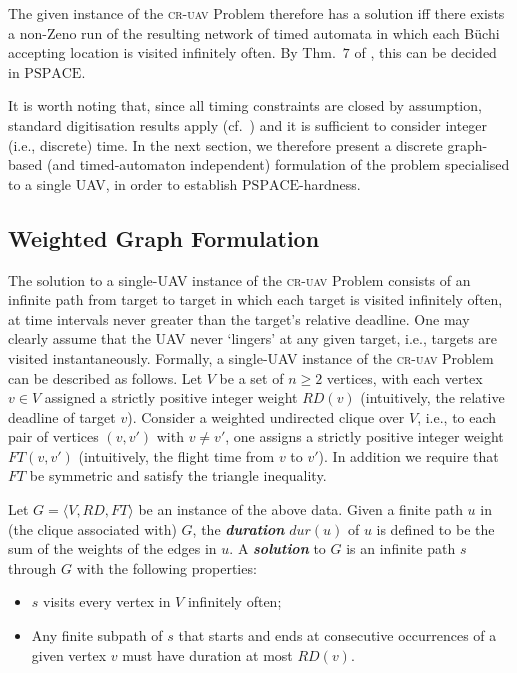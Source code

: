 \documentclass[envcountsame]{llncs}
\begin{document}
The given instance of the \textsc{cr-uav} Problem therefore has a
solution iff there exists a non-Zeno run of the resulting network of
timed automata in which each B\"uchi accepting location is visited
infinitely often. By Thm.~$7$ of \cite{Alur1998}, this can be decided in
$\mathrm{PSPACE}$.

It is worth noting that, since all timing constraints are closed by
assumption, standard digitisation results apply (cf.~\cite{Henzinger1992}) and
it is sufficient to consider integer (i.e., discrete) time. In the
next section, we therefore present a discrete graph-based (and
timed-automaton independent) formulation of the problem specialised to
a single UAV, in order to establish $\mathrm{PSPACE}$-hardness.

\subsection{Weighted Graph Formulation}

The solution to a single-UAV instance of the \textsc{cr-uav} Problem
consists of an infinite path from target to target in which each
target is visited infinitely often, at time intervals never greater
than the target's relative deadline. One may clearly assume that the
UAV never `lingers' at any given target, i.e., targets are visited
instantaneously.  Formally, a single-UAV instance of the \textsc{cr-uav} Problem can be
described as follows. Let $V$ be a set of $n \geq 2$ vertices, with
each vertex $v \in V$ assigned a strictly positive integer weight
$\mathit{RD}(v)$ (intuitively, the relative deadline of target
$v$). Consider a weighted undirected clique over $V$, i.e., to each
pair of vertices $(v,v')$ with $v \neq v'$, one assigns a strictly
positive integer weight $\mathit{FT}(v,v')$ (intuitively, the flight
time from $v$ to $v'$). In addition we require that $\mathit{FT}$ be
symmetric and satisfy the triangle inequality.








Let $G = \langle V,\mathit{RD}, \mathit{FT}\rangle$ be an instance of
the above data. Given a finite path $u$ in (the clique associated
with) $G$, the \emph{\textbf{duration}} $\mathit{dur}(u)$ of $u$ is
defined to be the sum of the weights of the edges in $u$. A
\emph{\textbf{solution}} to $G$ is an infinite path $s$ through $G$ with the
following properties:
\begin{itemize}
\item $s$ visits every vertex in $V$ infinitely often;
\item Any finite subpath of $s$ that starts and ends at
  consecutive occurrences of a given vertex $v$ must have duration at
  most $\mathit{RD}(v)$.
\end{itemize}
\end{document}
